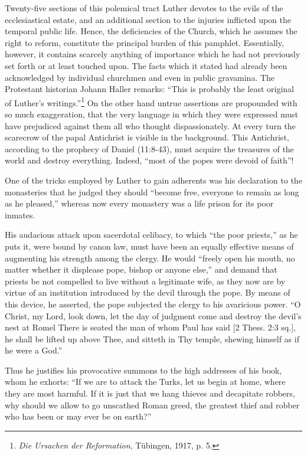 Twenty-five sections of this polemical tract Luther devotes to
the evils of the ecclesiastical estate, and an additional section to the
injuries inflicted upon the temporal public life. Hence, the deficiencies
of the Church, which he assumes the right to reform, constitute the
principal burden of this pamphlet. Essentially, however, it contains
scarcely anything of importance which he had not previously set
forth or at least touched upon. The facts which it stated had already
been acknowledged by individual churchmen and even in public
gravamina. The Protestant historian Johann Haller remarks: “This
is probably the least original of Luther’s writings.”\footnote
{\textit{Die Ursachen der Reformation}, Tübingen, 1917, p. 5.}
On the other
hand untrue assertions are propounded with so much exaggeration,
that the very language in which they were expressed must have prejudiced
against them all who thought dispassionately. At every turn
the scarecrow of the papal Antichrist is visible in the background.
This Antichrist, according to the prophecy of Daniel (11:8-43),
must acquire the treasures of the world and destroy everything. Indeed,
“most of the popes were devoid of faith”!

One of the tricks employed by Luther to gain adherents was his declaration
to the monasteries that he judged they should “become free, everyone
to remain as long as he pleased,” whereas now every monastery was a life
prison for its poor inmates.

His audacious attack upon sacerdotal celibacy, to which “the poor
priests,” as he puts it, were bound by canon law, must have been an equally
effective means of augmenting his strength among the clergy. He would
“freely open his mouth, no matter whether it displease pope, bishop or anyone
else,” and demand that priests be not compelled to live without a legitimate
wife, as they now are by virtue of an institution introduced by the devil
through the pope. By means of this device, he asserted, the pope subjected
the clergy to his avaricious power. “O Christ, my Lord, look down, let the
day of judgment come and destroy the devil’s nest at Romel There is seated
the man of whom Paul has said [2 Thess. 2:3 sq.], he shall be lifted up
above Thee, and sitteth in Thy temple, shewing himself as if he were a
God.”

Thus he justifies his provocative summons to the high addresses of his
book, whom he exhorts: “If we are to attack the Turks, let us begin at
home, where they are most harmful. If it is just that we hang thieves and
decapitate robbers, why should we allow to go unscathed Roman greed,
the greatest thief and robber who has been or may ever be on earth?”


